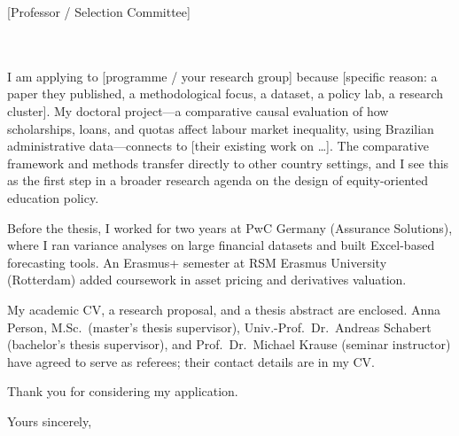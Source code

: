 \documentclass[a4paper,11pt]{letter}
\begin{document}
\begin{letter}{%
    [Professor / Selection Committee] \\
    [Department of Economics] \\
    [University] \\
    [Address]
}

I am applying to [programme / your research group] because [specific reason: a paper they published, a methodological focus, a dataset, a policy lab, a research cluster]. My doctoral project---a comparative causal evaluation of how scholarships, loans, and quotas affect labour market inequality, using Brazilian administrative data---connects to [their existing work on \ldots]. The comparative framework and methods transfer directly to other country settings, and I see this as the first step in a broader research agenda on the design of equity-oriented education policy.


Before the thesis, I worked for two years at PwC Germany (Assurance Solutions), where I ran variance analyses on large financial datasets and built Excel-based forecasting tools. An Erasmus+ semester at RSM Erasmus University (Rotterdam) added coursework in asset pricing and derivatives valuation.


My academic CV, a research proposal, and a thesis abstract are enclosed. Anna Person, M.Sc.\ (master's thesis supervisor), Univ.-Prof.\ Dr.\ Andreas Schabert (bachelor's thesis supervisor), and Prof.\ Dr.\ Michael Krause (seminar instructor) have agreed to serve as referees; their contact details are in my CV.

Thank you for considering my application.

\closing{Yours sincerely,}

\end{letter}
\end{document}
